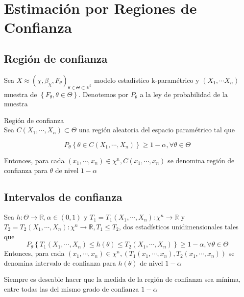 \section{Estimación por Regiones de Confianza}

\subsection{Región de confianza}
Sea $X \approx\left(\chi, \beta_{\chi}, F_{\theta}\right)_{\theta \in \Theta
    \subset \mathbb{R}^{k}}$ modelo estadístico k-paramétrico y $\left(X_{1},
    \cdots X_{n}\right)$ muestra de $\left\{F_{\theta}, \theta \in \Theta\right\}$.
Denotemos por $P_{\theta}$ a la ley de probabilidad de la muestra

Región de confianza\\ Sea $C\left(X_{1}, \cdots, X_{n}\right) \subset \Theta$
una región aleatoria del espacio paramétrico tal que

$$
    P_{\theta}\left\{\theta \in C\left(X_{1}, \cdots, X_{n}\right)\right\} \geq 1-\alpha, \forall \theta \in \Theta
$$

Entonces, para cada $\left(x_{1}, \cdots, x_{n}\right) \in \chi^{n},
    C\left(x_{1}, \cdots, x_{n}\right)$ se denomina región de confianza para
$\theta$ de nivel $1-\alpha$

\subsection{Intervalos de confianza}

\begin{definición}
Sea $h: \Theta \rightarrow \mathbb{R}, \alpha \in(0,1)$ y $T_{1}=T_{1}\left(X_{1}, \cdots, X_{n}\right): \chi^{n} \rightarrow \mathbb{R}$ y $T_{2}=T_{2}\left(X_{1}, \cdots, X_{n}\right): \chi^{n} \rightarrow \mathbb{R}, T_{1} \leq T_{2}$, dos estadísticos unidimensionales tales que
$$P_{\theta}\left\{T_{1}\left(X_{1}, \cdots, X_{n}\right) \leq h(\theta) \leq T_{2}\left(X_{1}, \cdots, X_{n}\right)\right\} \geq 1-\alpha, \forall \theta \in \Theta$$
Entonces, para cada $\left(x_{1}, \cdots, x_{n}\right) \in \chi^{n},\left(T_{1}\left(x_{1}, \cdots, x_{n}\right), T_{2}\left(x_{1}, \cdots, x_{n}\right)\right)$ se denomina intervalo de confianza para $h(\theta)$ de nivel $1-\alpha$
\end{definición}

\begin{observación}
Siempre es deseable hacer que la medida de la región de confianza sea mínima, entre todas las del mismo grado de confianza $1-\alpha$
\end{observación}

